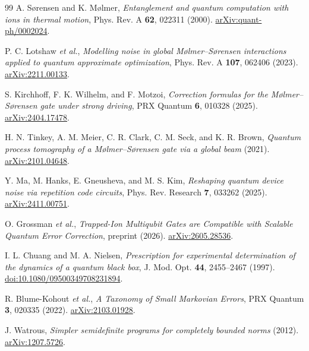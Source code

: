 \documentclass[a4paper,11pt]{article}
\begin{document}
\begin{thebibliography}{99}
A. S{\o}rensen and K. M{\o}lmer,
\emph{Entanglement and quantum computation with ions in thermal motion},
Phys. Rev. A \textbf{62}, 022311 (2000).
\href{https://arxiv.org/abs/quant-ph/0002024}{arXiv:quant-ph/0002024}.

P. C. Lotshaw \textit{et al.},
\emph{Modelling noise in global M{\o}lmer--S{\o}rensen interactions
applied to quantum approximate optimization},
Phys. Rev. A \textbf{107}, 062406 (2023).
\href{https://arxiv.org/abs/2211.00133}{arXiv:2211.00133}.

S. Kirchhoff, F. K. Wilhelm, and F. Motzoi,
\emph{Correction formulas for the M{\o}lmer--S{\o}rensen gate under
strong driving}, PRX Quantum \textbf{6}, 010328 (2025).
\href{https://arxiv.org/abs/2404.17478}{arXiv:2404.17478}.

H. N. Tinkey, A. M. Meier, C. R. Clark, C. M. Seck, and K. R. Brown,
\emph{Quantum process tomography of a M{\o}lmer--S{\o}rensen gate
via a global beam} (2021).
\href{https://arxiv.org/abs/2101.04648}{arXiv:2101.04648}.

Y. Ma, M. Hanks, E. Gneusheva, and M. S. Kim,
\emph{Reshaping quantum device noise via repetition code circuits},
Phys. Rev. Research \textbf{7}, 033262 (2025).
\href{https://arxiv.org/abs/2411.00751}{arXiv:2411.00751}.

O. Grossman \textit{et al.},
\emph{Trapped-Ion Multiqubit Gates are Compatible with Scalable
Quantum Error Correction}, preprint (2026).
\href{https://arxiv.org/abs/2605.28536}{arXiv:2605.28536}.

I. L. Chuang and M. A. Nielsen,
\emph{Prescription for experimental determination of the dynamics
of a quantum black box}, J. Mod. Opt. \textbf{44}, 2455--2467 (1997).
\href{https://doi.org/10.1080/09500349708231894}{doi:10.1080/09500349708231894}.

R. Blume-Kohout \textit{et al.},
\emph{A Taxonomy of Small Markovian Errors},
PRX Quantum \textbf{3}, 020335 (2022).
\href{https://arxiv.org/abs/2103.01928}{arXiv:2103.01928}.

J. Watrous, \emph{Simpler semidefinite programs for completely bounded
norms} (2012).
\href{https://arxiv.org/abs/1207.5726}{arXiv:1207.5726}.
\end{thebibliography}
\end{document}
